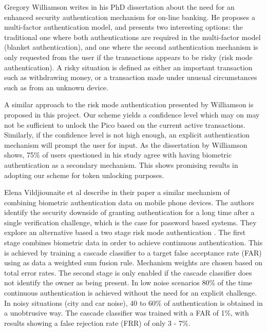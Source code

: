 Gregory Williamson writes in his PhD dissertation \cite{williamson2006enhanced} about the need for an enhanced security authentication mechanism for on-line banking. He proposes a multi-factor authentication model, and presents two interesting options: the traditional one where both authentications are required in the multi-factor model (blanket authentication), and one where the second authentication mechanism is only requested from the user if the transactions appears to be risky (risk mode authentication). A risky situation is defined as either an important transaction such as withdrawing money, or a transaction made under unusual circumstances such as from an unknown device. 

A similar approach to the risk mode authentication presented by Williamson \cite{williamson2006enhanced} is proposed in this project. Our scheme yields a confidence level which may on may not be sufficient to unlock the Pico based on the current active transactions. Similarly, if the confidence level is not high enough, an explicit authentication mechanism will prompt the user for input. As the dissertation by Williamson shows, 75\% of users questioned in his study agree with having biometric authentication as a secondary mechanism. This shows promising results in adopting our scheme for token unlocking purposes.

Elena Vildjiounaite et al describe in their paper \cite{vildjiounaite2007increasing} a similar mechanism of combining biometric authentication data on mobile phone devices. The authors identify the security downside of granting authentication for a long time after a single verification challenge, which is the case for password based systems. They explore an alternative based a two stage risk mode authentication \cite{williamson2006enhanced}. The first stage combines biometric data in order to achieve continuous authentication. This is achieved by training a cascade classifier to a target false acceptance rate (FAR) using as data a weighted sum fusion rule. Mechanism weights are chosen based on total error rates. The second stage is only enabled if the cascade classifier does not identify the owner as being present. In low noise scenarios 80\% of the time continuous authentication is achieved without the need for an explicit challenge. In noisy situations (city and car noise), 40 to 60\% of authentication is obtained in a unobtrusive way. The cascade classifier was trained with a FAR of 1\%, with results showing a false rejection rate (FRR) of only 3 - 7\%.

